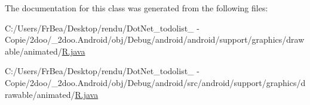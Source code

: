 The documentation for this class was generated from the following files:\begin{CompactItemize}
\item 
C:/Users/FrBea/Desktop/rendu/DotNet\_\-todolist\_ - Copie/2doo/\_\-2doo.Android/obj/Debug/android/android/support/graphics/drawable/animated/\hyperlink{android_2support_2graphics_2drawable_2animated_2_r_8java}{R.java}\item 
C:/Users/FrBea/Desktop/rendu/DotNet\_\-todolist\_ - Copie/2doo/\_\-2doo.Android/obj/Debug/android/src/android/support/graphics/drawable/animated/\hyperlink{src_2android_2support_2graphics_2drawable_2animated_2_r_8java}{R.java}\end{CompactItemize}
